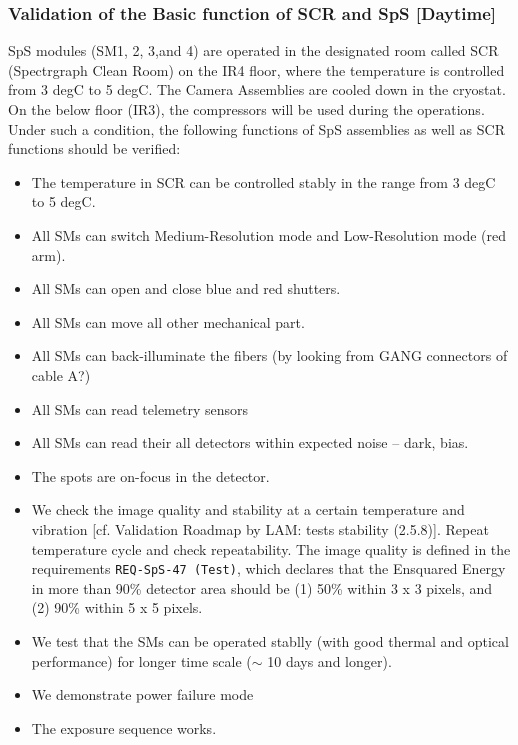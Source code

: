 \subsubsection{Validation of the Basic function of SCR and SpS [Daytime]}\label{secflow:SCR}

SpS modules (SM1, 2, 3,and 4) are operated in the designated room called SCR (Spectrgraph Clean Room) on the IR4 floor, where the temperature is controlled from 3 degC to 5 degC.
The Camera Assemblies are cooled down in the cryostat.
On the below floor (IR3), the compressors will be used during the operations.
Under such a condition, the following functions of SpS assemblies as well as SCR functions should be verified:
\begin{itemize}
\item The temperature in SCR can be controlled stably in the range from 3 degC to 5 degC.
\item All SMs can switch Medium-Resolution mode and Low-Resolution mode (red arm).
\item All SMs can open and close blue and red shutters.
\item All SMs can move all other mechanical part. 
\item All SMs can back-illuminate the fibers (by looking from GANG connectors of cable A?)
\item All SMs can read telemetry sensors
\item All SMs can read their all detectors within expected noise -- dark, bias.
\item The spots are on-focus in the detector.
\item We check the image quality and stability at a certain temperature and vibration [cf. Validation Roadmap by LAM: tests stability (2.5.8)].
Repeat temperature cycle and check repeatability.
The image quality is defined in the requirements {\tt REQ-SpS-47 (Test)}, which declares that the Ensquared Energy in more than 90\% detector area should be (1) 50\% within 3 x 3 pixels, and (2) 90\% within 5 x 5 pixels.
\item We test that the SMs can be operated stablly (with good thermal and optical performance) for longer time scale ($\sim$ 10 days and longer).
\item We demonstrate power failure mode
\item The exposure sequence works.
\end{itemize}

